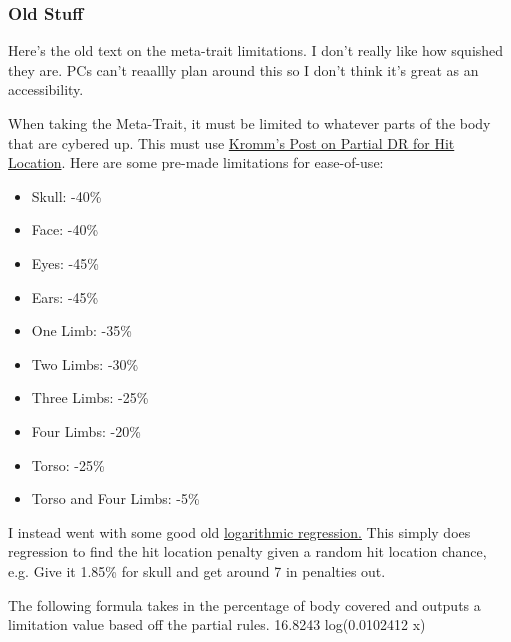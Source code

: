 	
	
	
	\begin{multicols*}{2}
	\subsubsection{Old Stuff}
	
	Here's the old text on the meta-trait limitations. I don't really like how squished they are. PCs can't reaallly plan around this so I don't think it's great as an accessibility.
	
	When taking the Meta-Trait, it must be limited to whatever parts of the body that are cybered up. This must use \textcolor{Blue}{\href{http://forums.sjgames.com/showpost.php?p=623207&postcount=1}{Kromm's Post on Partial DR for Hit Location}}. Here are some pre-made limitations for ease-of-use:
	
	\begin{itemize}
		\itemsep0em 
		\item Skull: -40\%
		\item Face: -40\%
		\item Eyes: -45\%
		\item Ears: -45\%
		\item One Limb: -35\%
		\item Two Limbs: -30\%
		\item Three Limbs: -25\%
		\item Four Limbs: -20\%
		\item Torso: -25\%
		\item Torso and Four Limbs: -5\%
	\end{itemize}
	
	\label{partial}
	
	I instead went with some good old \href{https://www.wolframalpha.com/input?i=logarithmic+regression&assumption=%7B%22C%22%2C+%22logarithmic+regression%22%7D+-%3E+%7B%22Calculator%22%7D&assumption=%7B%22F%22%2C+%22LogFitCalculator%22%2C+%22data2%22%7D+-%3E%22%7B%7B0.463%2C9%7D%2C%7B1.85%2C7%7D%2C%7B2.78%2C5%7D%2C%7B11.57%2C4%7D%2C%7B9.72%2C4%7D%2C%7B11.57%2C4%7D%2C%7B16.66%2C4%7D%2C%7B36.57%2C1%7D%2C%7B21.29%2C2%7D%2C%7B28.23%2C2%7D%7D%22}{logarithmic regression.} This simply does regression to find the hit location penalty given a random hit location chance, e.g. Give it 1.85\% for skull and get around 7 in penalties out.
	
	The following formula takes in the percentage of body covered and outputs a limitation value based off the partial rules.
	16.8243 log(0.0102412 x)
	

\end{multicols*}
